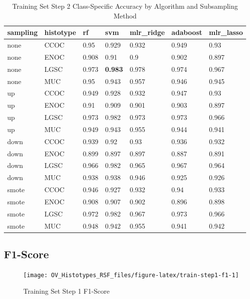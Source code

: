 \documentclass[
]{report}
\begin{document}
\begin{table}

\caption{\label{tab:train-step2-accuracy-class-table}Training Set Step 2 Class-Specific Accuracy by Algorithm and Subsampling Method}
\centering
\begin{tabular}[t]{l|l|l|l|l|l|l}
\hline
sampling & histotype & rf & svm & mlr\_ridge & adaboost & mlr\_lasso\\
\hline
none & CCOC & 0.95 & 0.929 & 0.932 & 0.949 & 0.93\\
\hline
none & ENOC & 0.908 & 0.91 & 0.9 & 0.902 & 0.897\\
\hline
none & LGSC & 0.973 & \textbf{0.983} & 0.978 & 0.974 & 0.967\\
\hline
none & MUC & 0.95 & 0.943 & 0.957 & 0.946 & 0.945\\
\hline
up & CCOC & 0.949 & 0.928 & 0.932 & 0.947 & 0.93\\
\hline
up & ENOC & 0.91 & 0.909 & 0.901 & 0.903 & 0.897\\
\hline
up & LGSC & 0.973 & 0.982 & 0.973 & 0.973 & 0.966\\
\hline
up & MUC & 0.949 & 0.943 & 0.955 & 0.944 & 0.941\\
\hline
down & CCOC & 0.939 & 0.92 & 0.93 & 0.936 & 0.932\\
\hline
down & ENOC & 0.899 & 0.897 & 0.897 & 0.887 & 0.891\\
\hline
down & LGSC & 0.966 & 0.982 & 0.965 & 0.967 & 0.964\\
\hline
down & MUC & 0.938 & 0.938 & 0.946 & 0.925 & 0.926\\
\hline
smote & CCOC & 0.946 & 0.927 & 0.932 & 0.94 & 0.933\\
\hline
smote & ENOC & 0.908 & 0.907 & 0.902 & 0.896 & 0.898\\
\hline
smote & LGSC & 0.972 & 0.982 & 0.967 & 0.973 & 0.966\\
\hline
smote & MUC & 0.948 & 0.942 & 0.955 & 0.941 & 0.942\\
\hline
\end{tabular}
\end{table}

\hypertarget{f1-score-1}{%
\subsection{F1-Score}\label{f1-score-1}}

\begin{figure}[H]

{\centering \texttt{[image: OV\_Histotypes\_RSF\_files/figure-latex/train-step1-f1-1]} 

}

\caption{Training Set Step 1 F1-Score}\label{fig:train-step1-f1}
\end{figure}
\end{document}
